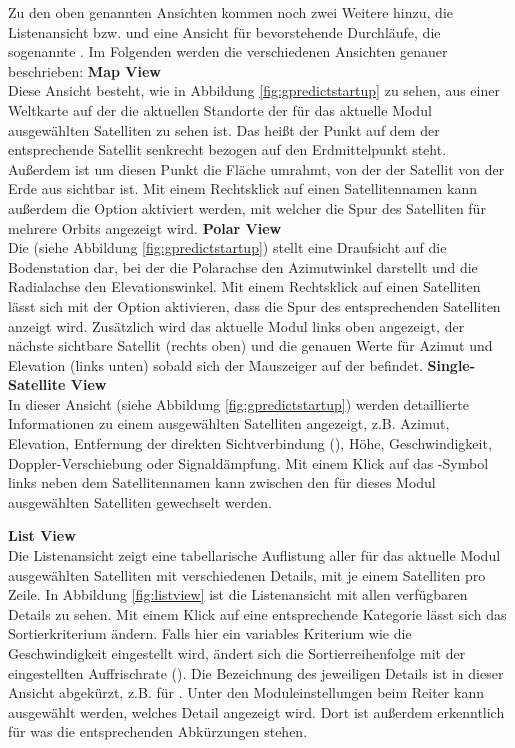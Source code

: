 Zu den oben genannten Ansichten kommen noch zwei Weitere hinzu, die Listenansicht bzw.  und eine Ansicht für bevorstehende Durchläufe, die sogenannte . Im Folgenden werden die verschiedenen Ansichten genauer beschrieben:\newpar
\textbf{Map View}\\
Diese Ansicht besteht, wie in Abbildung \ref{fig:gpredictstartup} zu sehen, aus einer Weltkarte auf der die aktuellen Standorte der für das aktuelle Modul ausgewählten Satelliten zu sehen ist. Das heißt der Punkt auf dem der entsprechende Satellit senkrecht bezogen auf den Erdmittelpunkt steht. Außerdem ist um diesen Punkt die Fläche umrahmt, von der der Satellit von der Erde aus sichtbar ist. Mit einem Rechtsklick auf einen Satellitennamen kann außerdem die Option  aktiviert werden, mit welcher die Spur des Satelliten für mehrere Orbits angezeigt wird.\newpar
\textbf{Polar View}\\
Die  (siehe Abbildung \ref{fig:gpredictstartup}) stellt eine Draufsicht auf die Bodenstation dar, bei der die Polarachse den Azimutwinkel darstellt und die Radialachse den Elevationswinkel. Mit einem Rechtsklick auf einen Satelliten lässt sich mit der Option  aktivieren, dass die Spur des entsprechenden Satelliten anzeigt wird. Zusätzlich wird das aktuelle Modul links oben angezeigt, der nächste sichtbare Satellit (rechts oben) und die genauen Werte für Azimut und Elevation (links unten) sobald sich der Mauszeiger auf der  befindet.\newpar
\textbf{Single-Satellite View}\\
In dieser Ansicht (siehe Abbildung \ref{fig:gpredictstartup}) werden detaillierte Informationen zu einem ausgewählten Satelliten angezeigt, z.B. Azimut, Elevation, Entfernung der direkten Sichtverbindung (), Höhe, Geschwindigkeit, Doppler-Verschiebung oder Signaldämpfung. Mit einem Klick auf das \myvsymbol-Symbol links neben dem Satellitennamen kann zwischen den für dieses Modul ausgewählten Satelliten gewechselt werden.

\clearpage

\textbf{List View}\\
Die Listenansicht zeigt eine tabellarische Auflistung aller für das aktuelle Modul ausgewählten Satelliten mit verschiedenen Details, mit je einem Satelliten pro Zeile. In Abbildung \ref{fig:listview} ist die Listenansicht mit allen verfügbaren Details zu sehen. Mit einem Klick auf eine entsprechende Kategorie lässt sich das Sortierkriterium ändern. Falls hier ein variables Kriterium wie die Geschwindigkeit eingestellt wird, ändert sich die Sortierreihenfolge mit der eingestellten Auffrischrate (). Die Bezeichnung des jeweiligen Details ist in dieser Ansicht abgekürzt, z.B.  für . Unter den Moduleinstellungen beim Reiter  kann ausgewählt werden, welches Detail angezeigt wird. Dort ist außerdem erkenntlich für was die entsprechenden Abkürzungen stehen.

